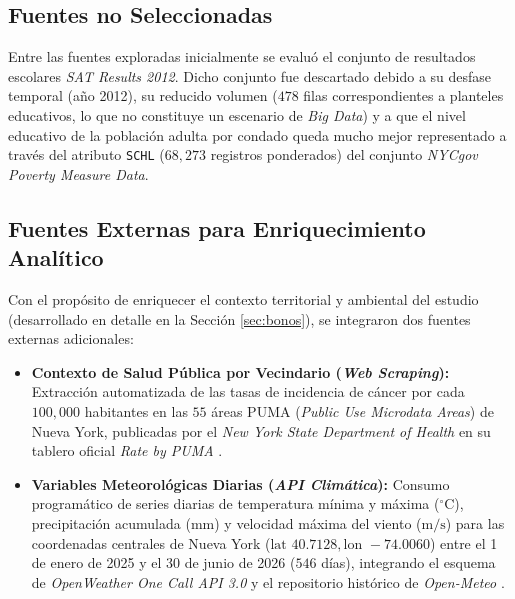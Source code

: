 \subsection{Fuentes no Seleccionadas}
Entre las fuentes exploradas inicialmente se evaluó el conjunto de resultados escolares \textit{SAT Results 2012}. Dicho conjunto fue descartado debido a su desfase temporal (año 2012), su reducido volumen ($478$ filas correspondientes a planteles educativos, lo que no constituye un escenario de \textit{Big Data}) y a que el nivel educativo de la población adulta por condado queda mucho mejor representado a través del atributo \texttt{SCHL} ($68,273$ registros ponderados) del conjunto \textit{NYCgov Poverty Measure Data}.

\subsection{Fuentes Externas para Enriquecimiento Analítico}
\label{subsec:fuentes_externas_seleccion}

Con el propósito de enriquecer el contexto territorial y ambiental del estudio (desarrollado en detalle en la Sección \ref{sec:bonos}), se integraron dos fuentes externas adicionales:

\begin{itemize}
    \item \textbf{Contexto de Salud Pública por Vecindario (\textit{Web Scraping}):} Extracción automatizada de las tasas de incidencia de cáncer por cada $100,000$ habitantes en las $55$ áreas PUMA (\textit{Public Use Microdata Areas}) de Nueva York, publicadas por el \textit{New York State Department of Health} en su tablero oficial \textit{Rate by PUMA} \cite{nys_cancer_registry_2026}.
    \item \textbf{Variables Meteorológicas Diarias (\textit{API Climática}):} Consumo programático de series diarias de temperatura mínima y máxima ($^\circ\text{C}$), precipitación acumulada ($\text{mm}$) y velocidad máxima del viento ($\text{m/s}$) para las coordenadas centrales de Nueva York ($\text{lat } 40.7128, \text{lon } -74.0060$) entre el 1 de enero de 2025 y el 30 de junio de 2026 ($546$ días), integrando el esquema de \textit{OpenWeather One Call API 3.0} \cite{openweather_onecall_2026} y el repositorio histórico de \textit{Open-Meteo} \cite{openmeteo_historical_2026}.
\end{itemize}

